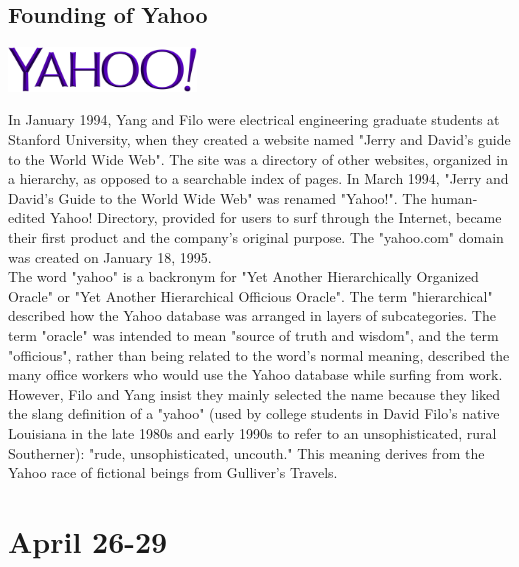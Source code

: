 \documentclass[11pt]{report}
\begin{document}
\subsection{Founding of Yahoo}
\vspace{2mm}\begin{center}\includegraphics[width=5cm]{./img/yahooLogo.jpg}\end{center}
In January 1994, Yang and Filo were electrical engineering graduate students at Stanford University, when they created a website named "Jerry and David's guide to the World Wide Web". The site was a directory of other websites, organized in a hierarchy, as opposed to a searchable index of pages. In March 1994, "Jerry and David's Guide to the World Wide Web" was renamed "Yahoo!". The human-edited Yahoo! Directory, provided for users to surf through the Internet, became their first product and the company's original purpose. The "yahoo.com" domain was created on January 18, 1995.\\
\indent The word "yahoo" is a backronym for "Yet Another Hierarchically Organized Oracle" or "Yet Another Hierarchical Officious Oracle". The term "hierarchical" described how the Yahoo database was arranged in layers of subcategories. The term "oracle" was intended to mean "source of truth and wisdom", and the term "officious", rather than being related to the word's normal meaning, described the many office workers who would use the Yahoo database while surfing from work. However, Filo and Yang insist they mainly selected the name because they liked the slang definition of a "yahoo" (used by college students in David Filo's native Louisiana in the late 1980s and early 1990s to refer to an unsophisticated, rural Southerner): "rude, unsophisticated, uncouth." This meaning derives from the Yahoo race of fictional beings from Gulliver's Travels.
\section{April 26-29}
\end{document}

